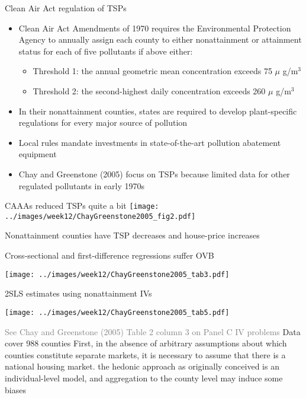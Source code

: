 \documentclass[11pt,notes=hide,aspectratio=169]{beamer}
\begin{document}
\begin{frame}{Clean Air Act regulation of TSPs}
\begin{itemize}
\item Clean Air Act Amendments of 1970 requires the Environmental Protection Agency to annually assign each county to either nonattainment or attainment status for each of five pollutants if above either:
\begin{itemize}
\item Threshold 1: the annual geometric mean concentration exceeds 75 $\mu$ g/m$^{3}$
\item Threshold 2: the second-highest daily concentration exceeds 260 $\mu$ g/m$^{3}$
\end{itemize}
\item In their nonattainment counties, states are required to develop plant-specific regulations for every major source of pollution
\item Local rules mandate investments in state-of-the-art pollution abatement equipment
\item Chay and Greenstone (2005) focus on TSPs because limited data for other regulated pollutants in early 1970s
\end{itemize}
\end{frame}
\begin{frame}{CAAAs reduced TSPs quite a bit}
\texttt{[image: ../images/week12/ChayGreenstone2005\_fig2.pdf]}
\end{frame}
\begin{frame}{Nonattainment counties have TSP decreases and house-price increases}
\end{frame}
\begin{frame}{Cross-sectional and first-difference regressions suffer OVB}
\begin{center}
\texttt{[image: ../images/week12/ChayGreenstone2005\_tab3.pdf]}
\end{center}
\end{frame}
\begin{frame}{2SLS estimates using nonattainment IVs}
\begin{center}
\texttt{[image: ../images/week12/ChayGreenstone2005\_tab5.pdf]}
\end{center}
\vspace{-4mm}
{\footnotesize \textcolor{gray}{See Chay and Greenstone (2005) Table 2 column 3 on Panel C IV problems}}
{  Data cover 988 counties
First, in the absence of arbitrary assumptions about which counties constitute separate markets, it is necessary to assume that there is a national housing market.
the hedonic approach as originally conceived is an individual-level model, and aggregation to the county level may induce some biases
}
\end{frame}
\end{document}
